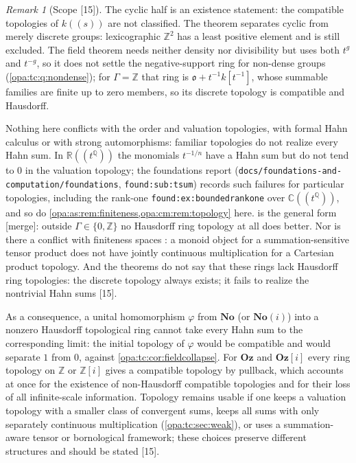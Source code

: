 \documentclass[11pt,oneside]{article}
\numberwithin{equation}{section}
\theoremstyle{definition}
\theoremstyle{remark}
\newtheorem{remark}[remark]{Remark}
\newcommand{\No}{\mathbf{No}}
\newcommand{\Oz}{\mathbf{Oz}}
\newcommand{\Og}{\mathbf{Oz}[i]}
\newcommand{\SC}{\mathbf{No}(i)}
\newcommand{\R}{\mathbb R}
\newcommand{\C}{\mathbb C}
\newcommand{\Q}{\mathbb Q}
\newcommand{\Z}{\mathbb Z}
\newcommand{\oo}{\mathfrak o}
\newcommand{\Hahn}[2]{#1((t^{#2}))}
\newcommand{\src}[1]{\textup{\textsf{\small[#1]}}}
\newcommand{\mergetag}{\textup{\textsf{\small[merge]}}}
\newcommand{\lbl}[1]{\nolinkurl{#1}}
\newcommand{\fn}[1]{\nolinkurl{#1}}
\begin{document}
\begin{remark}[Scope \src{15}]\label{opa:tc:rem:scope}
The cyclic half is an existence statement: the compatible topologies of $k((s))$ are not classified.
The theorem separates cyclic from merely discrete groups: lexicographic $\Z^2$ has a least positive
element and is still excluded. The field theorem needs neither density nor divisibility but uses both
$t^g$ and $t^{-g}$, so it does not settle the negative-support ring for non-dense groups
(\cref{opa:tc:q:nondense}); for $\Gamma=\Z$ that ring is $\oo+t^{-1}k[t^{-1}]$, whose summable families are
finite up to zero members, so its discrete topology is compatible and Hausdorff.

Nothing here conflicts with the order and valuation topologies, with formal Hahn calculus or with strong
automorphisms: familiar topologies do not realize every Hahn sum. In $\Hahn\R\Q$ the monomials $t^{-1/n}$
have a Hahn sum but do not tend to $0$ in the valuation topology; the foundations report
(\fn{docs/foundations-and-computation/foundations}, \lbl{found:sub:tsum}) records such failures for
particular topologies, including the rank-one \lbl{found:ex:boundedrankone} over $\C((t^\Q))$, and so do
\cref{opa:as:rem:finiteness,opa:cm:rem:topology} here.  is the general
form \mergetag: outside $\Gamma\in\{0,\Z\}$ no Hausdorff ring topology at all does better. Nor is there a
conflict with finiteness spaces \cite{BCJS}: a monoid object for a summation-sensitive tensor product
does not have jointly continuous multiplication for a Cartesian product topology. And the theorems do
not say that these rings lack Hausdorff ring topologies: the discrete topology always exists; it fails
to realize the nontrivial Hahn sums \src{15}.

As a consequence, a unital homomorphism $\varphi$ from $\No$ (or $\SC$) into a nonzero Hausdorff topological
ring cannot take every Hahn sum to the corresponding limit: the initial topology of $\varphi$ would be
compatible and would separate $1$ from $0$, against \cref{opa:tc:cor:fieldcollapse}. For $\Oz$ and $\Og$
every ring topology on $\Z$ or $\Z[i]$ gives a compatible topology by pullback, which accounts at once
for the existence of non-Hausdorff compatible topologies and for their loss of all infinite-scale
information. Topology remains usable if one keeps a valuation topology with a smaller class of
convergent sums, keeps all sums with only separately continuous multiplication
(\cref{opa:tc:sec:weak}), or uses a summation-aware tensor or bornological framework; these choices
preserve different structures and should be stated \src{15}.
\end{remark}
\end{document}
